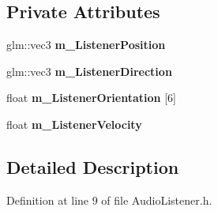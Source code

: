 \subsection*{Private Attributes}
\begin{DoxyCompactItemize}
\item 
glm\+::vec3 {\bfseries m\+\_\+\+Listener\+Position}\hypertarget{class_i_o_1_1_audio_1_1_audio_listener_a8423bc9e78d1cb76c7262630d0a66b73}{}\label{class_i_o_1_1_audio_1_1_audio_listener_a8423bc9e78d1cb76c7262630d0a66b73}

\item 
glm\+::vec3 {\bfseries m\+\_\+\+Listener\+Direction}\hypertarget{class_i_o_1_1_audio_1_1_audio_listener_a4b2875262a1f507955ce0b234a00aaf6}{}\label{class_i_o_1_1_audio_1_1_audio_listener_a4b2875262a1f507955ce0b234a00aaf6}

\item 
float {\bfseries m\+\_\+\+Listener\+Orientation} \mbox{[}6\mbox{]}\hypertarget{class_i_o_1_1_audio_1_1_audio_listener_a4bf95f2c7169fd0df97e064e35b972ce}{}\label{class_i_o_1_1_audio_1_1_audio_listener_a4bf95f2c7169fd0df97e064e35b972ce}

\item 
float {\bfseries m\+\_\+\+Listener\+Velocity}\hypertarget{class_i_o_1_1_audio_1_1_audio_listener_a66bba80d99062e6451e859ec8b22af43}{}\label{class_i_o_1_1_audio_1_1_audio_listener_a66bba80d99062e6451e859ec8b22af43}

\end{DoxyCompactItemize}


\subsection{Detailed Description}


Definition at line 9 of file Audio\+Listener.\+h.

